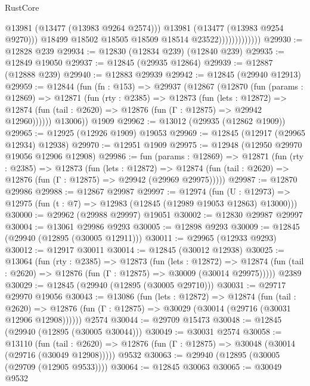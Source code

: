 \begin{lexlean}{RustCore}
\begin{coremodule}
                                  @13981
                                  (@13477 (@13983 @9264 @2574)))
                                @13981
                                (@13477 (@13983 @9254 @9270)))
                              @18499
                              @18502
                              @18505
                              @18509
                              @18514
                              @23522)))))))))))))
@29930 := @12828 @239
@29934 := @12830 (@12834 @239) (@12840 @239)
@29935 := @12849 @19050
@29937 := @12845 (@29935 @12864)
@29939 := @12887 (@12888 @239)
@29940 := @12883 @29939
@29942 := @12845 (@29940 @12913)
@29959 := @12844
    (fun (fn : @153) =>
    @29937
      (@12867
        (@12870
          (fun (params : @12869) =>
          @12871
            (fun (rty : @2385) =>
            @12873
              (fun (lets : @12872) =>
              @12874 (fun (tail : @2620) => @12876 (fun (Γ : @12875) => @29942 @12960))))))
        @13006))
    @1909
@29962 := @13012 (@29935 (@12862 @1909))
@29965 := @12925 (@12926 @1909) @19053
@29969 := @12845 (@12917 (@29965 @12934) @12938)
@29970 := @12951 @1909
@29975 := @12948 (@12950 @29970 @19056 @12906 @12908)
@29986 := fun (params : @12869) =>
  @12871
    (fun (rty : @2385) =>
    @12873
      (fun (lets : @12872) =>
      @12874 (fun (tail : @2620) => @12876 (fun (Γ : @12875) => @29942 (@29969 @29975)))))
@29987 := @12870 @29986
@29988 := @12867 @29987
@29997 := @12974
    (fun (U : @12973) => @12975 (fun (t : @7) => @12983 (@12845 (@12989 @19053 @12863) @13000)))
@30000 := @29962 (@29988 @29997) @19051
@30002 := @12830 @29987 @29997
@30004 := @13061 @29986 @9293
@30005 := @12898 @9293
@30009 := @12845 (@29940 (@12895 (@30005 @12911)))
@30011 := @29965 (@12933 @9293)
@30012 := @12917 @30011
@30014 := @12845 (@30012 @12938)
@30025 := @13064
    (fun (rty : @2385) =>
    @12873
      (fun (lets : @12872) =>
      @12874 (fun (tail : @2620) => @12876 (fun (Γ : @12875) => @30009 (@30014 @29975)))))
    @2389
@30029 := @12845 (@29940 (@12895 (@30005 @29710)))
@30031 := @29717 @29970 @19056
@30043 := @13086
    (fun (lets : @12872) =>
    @12874
      (fun (tail : @2620) =>
      @12876 (fun (Γ : @12875) => @30029 (@30014 (@29716 (@30031 @12906 @12908))))))
    @2574
@30044 := @29709 @15473
@30048 := @12845 (@29940 (@12895 (@30005 @30044)))
@30049 := @30031 @2574
@30058 := @13110
    (fun (tail : @2620) => @12876 (fun (Γ : @12875) => @30048 (@30014 (@29716 (@30049 @12908)))))
    @9532
@30063 := @29940 (@12895 (@30005 (@29709 (@12905 @9533))))
@30064 := @12845 @30063
@30065 := @30049 @9532

\end{coremodule}
\end{lexlean}

